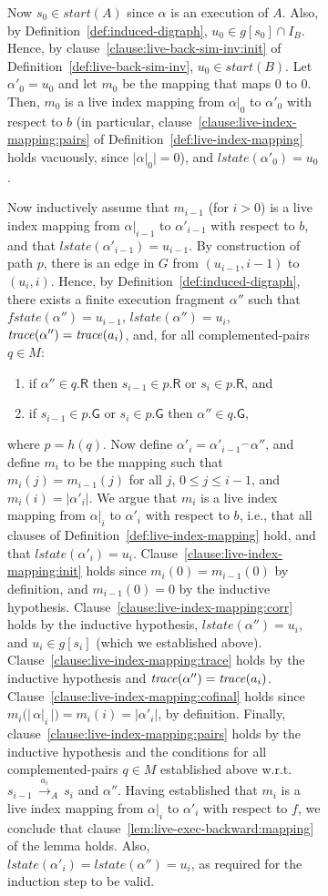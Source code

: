 \documentclass[11pt]{article}
\newcommand{\bn}{\begin{enumerate}}
\newcommand{\en}{\end{enumerate}}
\newcommand{\ints}{\cap}
\newcommand{\lla}[2]{\mbox{$\, \stackrel{#1}{\longrightarrow}_{#2} \,$}}
\newcommand{\G}{\mathsf{G}}
\newcommand{\R}{\mathsf{R}}
\newcommand{\al}{\alpha}
\newcommand{\cat}{\mbox{$^\frown$}}
\newcommand{\fstate}{\mathit{fstate}}
\newcommand{\lstate}{\mathit{lstate}}
\newcommand{\start}{\mathit{start}}
\begin{document}
\begin{figure}[htb]
\begin{figure}[htb]
Now $s_0 \in \start(A)$ since $\al$ is an execution of $A$.
Also, by Definition~\ref{def:induced-digraph}, $u_0 \in g[s_0] \ints I_B$.
Hence, by clause~\ref{clause:live-back-sim-inv:init} of 
Definition~\ref{def:live-back-sim-inv}, $u_0 \in \start(B)$.
Let $\al'_0 = u_0$ and let $m_0$ be the mapping that maps $0$ to
$0$. Then, $m_0$ is a live index mapping from $\al|_0$ to $\al'_0$ with
respect to $b$ (in particular,
clause~\ref{clause:live-index-mapping:pairs} of
Definition~\ref{def:live-index-mapping} holds vacuously, 
since $|\al |_0 | = 0$), and $\lstate(\al'_0) = u_0$.

Now inductively assume that $m_{i-1}$ (for $i > 0$) is a live index mapping from
$\al|_{i-1}$ to $\al'_{i-1}$ with respect to $b$, and that $\lstate(\al'_{i-1})
= u_{i-1}$. By construction of path $p$, there is an edge in $G$ from
$(u_{i-1},i-1)$ to $(u_i,i)$. Hence, by Definition~\ref{def:induced-digraph},
there exists a finite execution fragment $\al''$ such that 
$\fstate(\al'') = u_{i-1}$,
$\lstate(\al'') = u_i$, $\trace(\al'') = \trace(a_{i})$, and, for all 
complemented-pairs $q \in M$:
   \bn
   \item if $\al'' \in q.\R$ then
		$s_{i-1} \in p.\R$ or $s_{i} \in p.\R$, and

   \item if $s_{i-1} \in p.\G$ or $s_{i} \in p.\G$ then
		$\al'' \in q.\G$,
   \en
where $p = h(q)$.
Now define $\al'_i = \al'_{i-1}\cat\al''$,
and define $m_i$ to be the mapping such that $m_i(j) = m_{i-1}(j)$ for
all $j$, $0 \leq j \leq i-1$, and $m_i(i) = |\al'_i|$. We argue that $m_i$ is a
live index mapping from $\al|_i$ to $\al'_i$ with respect to
$b$, i.e., that all clauses of Definition~\ref{def:live-index-mapping}
hold, and that $\lstate(\al'_i) = u_i$.
Clause~\ref{clause:live-index-mapping:init} holds since $m_i(0) =
m_{i-1}(0)$ by definition, and $m_{i-1}(0) = 0$ by the inductive hypothesis.
Clause~\ref{clause:live-index-mapping:corr} holds by the inductive
hypothesis, $\lstate(\al'') = u_i$, and $u_i \in g[s_i]$ (which we established above).
Clause~\ref{clause:live-index-mapping:trace} holds by the inductive
hypothesis and $\trace(\al'') = \trace(a_i)$.
Clause~\ref{clause:live-index-mapping:cofinal} holds since $m_i(|\,\al|_i\,|)
= m_i(i) = |\al'_i|$, by definition.
Finally, clause~\ref{clause:live-index-mapping:pairs} holds by the inductive
hypothesis and the conditions for all complemented-pairs $q \in M$
established above w.r.t. $s_{i-1} \lla{a_i}{A} s_i$ and $\al''$.
Having established that $m_i$ is a live index mapping from $\al|_i$ to
$\al'_i$ with respect to $f$, we conclude that
clause~\ref{lem:live-exec-backward:mapping} of the lemma holds.
Also, $\lstate(\al'_i) = \lstate(\al'') = u_i$, as required for the induction
step to be valid.


\end{figure}
\end{figure}
\end{document}

